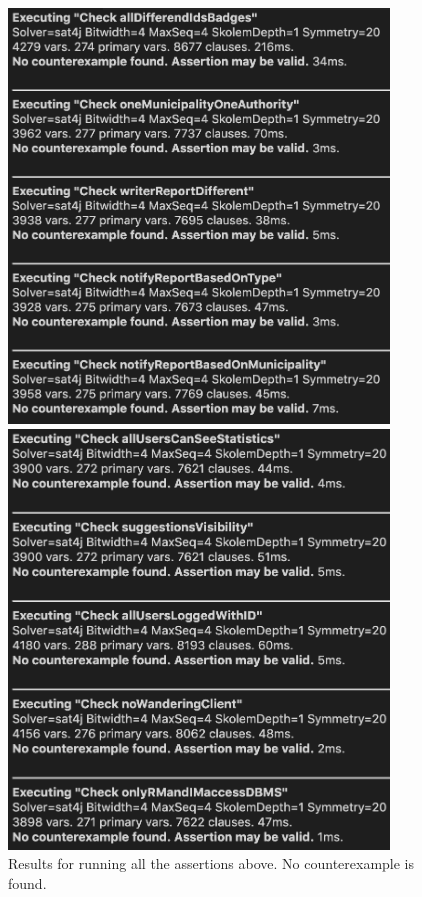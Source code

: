 \documentclass{report}
\begin{document}
\begin{figure}[ht!]
    \centering
    \begin{minipage}{0.45\textwidth}
        \centering
        \includegraphics[width=0.9\textwidth]{./img/assert1.png} %
    \end{minipage}\hfill
    \begin{minipage}{0.45\textwidth}
        \centering
        \includegraphics[width=0.9\textwidth]{./img/assert2.png} %
	\end{minipage}
	\label{fig:modelcheck}
	\caption{Results for running all the assertions above. No counterexample is found.}
\end{figure}
\newpage
\end{document}
